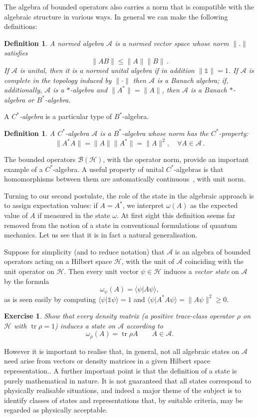 \documentclass[12pt]{article}
\newcommand{\1}{\mathds{1}}                         %
\newcommand{\Hcal}{\mathcal {H}}
\newcommand{\Bcal}{\mathcal {B}}
\newcommand{\HH}{{\mathcal{H}}}
\newcommand{\II}{{\mathbb{1}}}
\newcommand{\Ac}{{\mathcal{A}}}
\newcommand{\ip}[2]{\langle #1|#2\rangle}
\newtheorem{exercise}[theorem]{Exercise}
\newtheorem{df}[theorem]{Definition}}
\DeclareMathOperator{\tr}{tr}
\begin{document}
The algebra of bounded operators also carries a norm that is compatible with the algebraic structure in various ways. In general we can make the following definitions: 
\begin{df}
	A \emph{normed algebra} $\Ac$ is a normed vector space whose norm $\|.\|$ satisfies
	\[
	\|AB\|\leq\|A\|\|B\|\,.
	\] 
	If $\Ac$ is unital, then it is a \emph{normed unital algebra} if in addition $\|\1\|=1$. If $\Ac$ is complete in the topology induced by $\|\cdot\|$ then 
	$\Ac$ is a \emph{Banach algebra}; if, additionally, $\Ac$ is a $*$-algebra and $\|A^*\|=\|A\|$, then $\Ac$ is a \emph{Banach $*$-algebra} or $B^*$-algebra. 
\end{df} 
A \emph{$C^*$-algebra} is a particular type of $B^*$-algebra.  
\begin{df}
A \emph{$C^*$-algebra} $\Ac$ is a $B^*$-algebra whose norm has the $C^*$-property:
	\[
	\|A^* A \| = \|A\|\|A^*\| = \|A\|^2, \quad\forall A\in \Ac\,.
	\]
\end{df}
The bounded operators $\Bcal(\Hcal)$, with the operator norm, provide an important example of a $C^*$-algebra. A useful property of unital $C^*$-algebras is that homomorphisms between them are automatically continuous~\cite[Prop.~2.3.1]{BratRob:vol1}, with unit norm. 

Turning to our second postulate,  
the role of the state in the algebraic approach is to assign expectation values:
if $A=A^*$, we interpret $\omega(A)$ as the expected value of $A$ if measured in the state $\omega$. At first sight this definition seems far removed from the notion of a state in conventional formulations of quantum mechanics. Let us see that it is in fact a natural generalisation.

Suppose for simplicity (and to reduce notation) that $\Ac$ is an algebra of bounded operators acting on a Hilbert space $\HH$, with the unit of $\Ac$ coinciding with the unit operator on $\HH$. Then every unit vector $\psi\in\HH$ induces a \emph{vector state} on $\Ac$ by the formula
\[
\omega_\psi(A) = \ip{\psi}{A\psi},
\] 
as is seen easily by computing $\ip{\psi}{\II\psi}=1$ and $\ip{\psi}{A^*A\psi}=\|A\psi\|^2\ge 0$. 
\begin{exercise}
	Show that every density matrix (a positive trace-class operator $\rho$ on $\HH$ with $\tr\rho=1$) induces a state on $\Ac$ according to 
	\[
	\omega_\rho(A) = \tr\rho A\qquad A\in\Ac.
	\]
\end{exercise}
However it is important to realise that, in general, not all algebraic states on $\Ac$ need arise from vectors or density matrices in a given Hilbert space representation.. 
A further important point is that the definition of a state is purely mathematical in nature. It is not guaranteed that all states correspond to physically realisable situations, and indeed a major theme of the subject is to identify classes of states and representations that, by suitable criteria, may be regarded as physically acceptable. 
\end{document}
